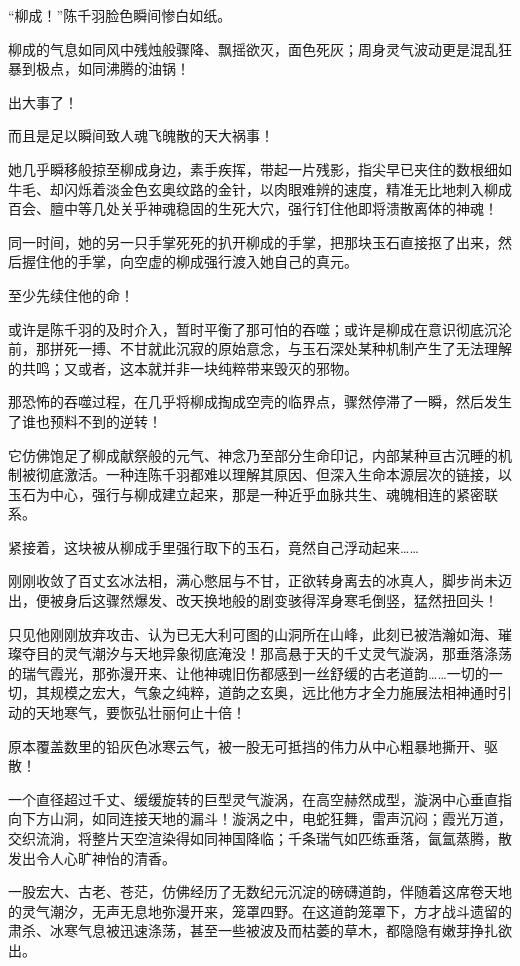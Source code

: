 “柳成！”陈千羽脸色瞬间惨白如纸。

柳成的气息如同风中残烛般骤降、飘摇欲灭，面色死灰；周身灵气波动更是混乱狂暴到极点，如同沸腾的油锅！

出大事了！

而且是足以瞬间致人魂飞魄散的天大祸事！

她几乎瞬移般掠至柳成身边，素手疾挥，带起一片残影，指尖早已夹住的数根细如牛毛、却闪烁着淡金色玄奥纹路的金针，以肉眼难辨的速度，精准无比地刺入柳成百会、膻中等几处关乎神魂稳固的生死大穴，强行钉住他即将溃散离体的神魂！

同一时间，她的另一只手掌死死的扒开柳成的手掌，把那块玉石直接抠了出来，然后握住他的手掌，向空虚的柳成强行渡入她自己的真元。

至少先续住他的命！

或许是陈千羽的及时介入，暂时平衡了那可怕的吞噬；或许是柳成在意识彻底沉沦前，那拼死一搏、不甘就此沉寂的原始意念，与玉石深处某种机制产生了无法理解的共鸣；又或者，这本就并非一块纯粹带来毁灭的邪物。

那恐怖的吞噬过程，在几乎将柳成掏成空壳的临界点，骤然停滞了一瞬，然后发生了谁也预料不到的逆转！

它仿佛饱足了柳成献祭般的元气、神念乃至部分生命印记，内部某种亘古沉睡的机制被彻底激活。一种连陈千羽都难以理解其原因、但深入生命本源层次的链接，以玉石为中心，强行与柳成建立起来，那是一种近乎血脉共生、魂魄相连的紧密联系。

紧接着，这块被从柳成手里强行取下的玉石，竟然自己浮动起来……

\vspace{2em}

刚刚收敛了百丈玄冰法相，满心憋屈与不甘，正欲转身离去的冰真人，脚步尚未迈出，便被身后这骤然爆发、改天换地般的剧变骇得浑身寒毛倒竖，猛然扭回头！

只见他刚刚放弃攻击、认为已无大利可图的山洞所在山峰，此刻已被浩瀚如海、璀璨夺目的灵气潮汐与天地异象彻底淹没！那高悬于天的千丈灵气漩涡，那垂落涤荡的瑞气霞光，那弥漫开来、让他神魂旧伤都感到一丝舒缓的古老道韵……一切的一切，其规模之宏大，气象之纯粹，道韵之玄奥，远比他方才全力施展法相神通时引动的天地寒气，要恢弘壮丽何止十倍！

原本覆盖数里的铅灰色冰寒云气，被一股无可抵挡的伟力从中心粗暴地撕开、驱散！

一个直径超过千丈、缓缓旋转的巨型灵气漩涡，在高空赫然成型，漩涡中心垂直指向下方山洞，如同连接天地的漏斗！漩涡之中，电蛇狂舞，雷声沉闷；霞光万道，交织流淌，将整片天空渲染得如同神国降临；千条瑞气如匹练垂落，氤氲蒸腾，散发出令人心旷神怡的清香。

一股宏大、古老、苍茫，仿佛经历了无数纪元沉淀的磅礴道韵，伴随着这席卷天地的灵气潮汐，无声无息地弥漫开来，笼罩四野。在这道韵笼罩下，方才战斗遗留的肃杀、冰寒气息被迅速涤荡，甚至一些被波及而枯萎的草木，都隐隐有嫩芽挣扎欲出。

